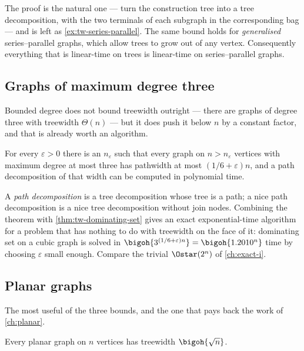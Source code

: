The proof is the natural one --- turn the construction tree into a tree
decomposition, with the two terminals of each subgraph in the corresponding bag
--- and is left as \cref{ex:tw-series-parallel}. The same bound holds for
\emph{generalised} series--parallel graphs, which allow trees to grow out of any
vertex. Consequently everything that is linear-time on trees is linear-time on
series--parallel graphs.

\subsection{Graphs of maximum degree three}

Bounded degree does not bound treewidth outright --- there are graphs of degree
three with treewidth $\Theta(n)$ --- but it does push it below $n$ by a
constant factor, and that is already worth an algorithm.

\begin{theorem}\label{thm:fomin-hoie}
For every $\varepsilon > 0$ there is an $n_\varepsilon$ such that every graph on
$n > n_\varepsilon$ vertices with maximum degree at most three has pathwidth at
most $(1/6 + \varepsilon)n$, and a path decomposition of that width can be
computed in polynomial time.
\end{theorem}

A \emph{path decomposition} is a tree decomposition whose tree is a path; a nice
path decomposition is a nice tree decomposition without join nodes. Combining
the theorem with \cref{thm:tw-dominating-set} gives an exact exponential-time
algorithm for a problem that has nothing to do with treewidth on the face of
it: dominating set on a cubic graph is solved in
$\bigoh{3^{(1/6+\varepsilon)n}} = \bigoh{1.2010^n}$ time by choosing
$\varepsilon$ small enough. Compare the trivial $\Ostar(2^n)$ of
\cref{ch:exact-i}.

\subsection{Planar graphs}

The most useful of the three bounds, and the one that pays back the work of
\cref{ch:planar}.

\begin{theorem}\label{thm:tw-planar}
Every planar graph on $n$ vertices has treewidth $\bigoh{\sqrt n}$.
\end{theorem}

